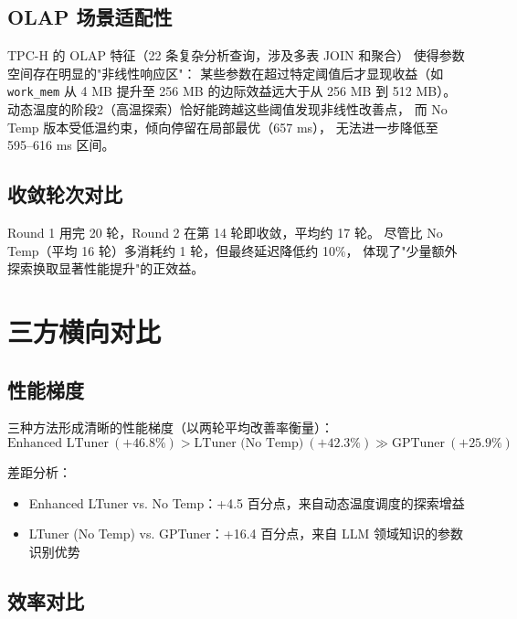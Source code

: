 \subsection{OLAP 场景适配性}

TPC-H 的 OLAP 特征（22 条复杂分析查询，涉及多表 JOIN 和聚合）
使得参数空间存在明显的"非线性响应区"：
某些参数在超过特定阈值后才显现收益（如 \texttt{work\_mem} 从 4 MB
提升至 256 MB 的边际效益远大于从 256 MB 到 512 MB）。
动态温度的阶段2（高温探索）恰好能跨越这些阈值发现非线性改善点，
而 No Temp 版本受低温约束，倾向停留在局部最优（657 ms），
无法进一步降低至 595--616 ms 区间。

\subsection{收敛轮次对比}

Round 1 用完 20 轮，Round 2 在第 14 轮即收敛，平均约 17 轮。
尽管比 No Temp（平均 16 轮）多消耗约 1 轮，但最终延迟降低约 10\%，
体现了"少量额外探索换取显著性能提升"的正效益。



\section{三方横向对比}

\subsection{性能梯度}

三种方法形成清晰的性能梯度（以两轮平均改善率衡量）：
\begin{equation}
\text{Enhanced LTuner}\ (+46.8\%) > \text{LTuner (No Temp)}\ (+42.3\%) \gg \text{GPTuner}\ (+25.9\%)
\end{equation}

差距分析：
\begin{itemize}
  \item Enhanced LTuner vs. No Temp：+4.5 百分点，来自动态温度调度的探索增益
  \item LTuner (No Temp) vs. GPTuner：+16.4 百分点，来自 LLM 领域知识的参数识别优势
\end{itemize}

\subsection{效率对比}

